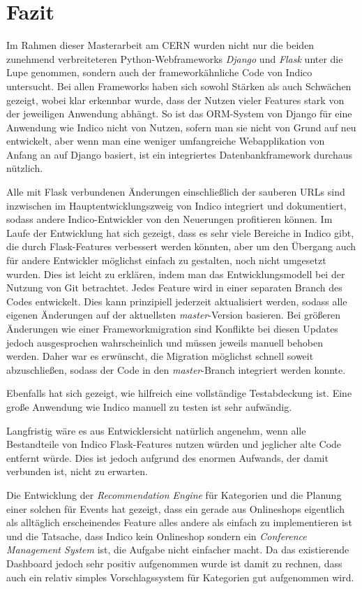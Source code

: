 \chapter{Fazit}

Im Rahmen dieser Masterarbeit am CERN wurden nicht nur die beiden zunehmend verbreiteteren
Python-Webframeworks \emph{Django} und \emph{Flask} unter die Lupe genommen, sondern auch der
frameworkähnliche Code von Indico untersucht. Bei allen Frameworks haben sich sowohl Stärken als
auch Schwächen gezeigt, wobei klar erkennbar wurde, dass der Nutzen vieler Features stark von der
jeweiligen Anwendung abhängt. So ist das ORM-System von Django für eine Anwendung
wie Indico nicht von Nutzen, sofern man sie nicht von Grund auf neu entwickelt, aber wenn man eine
weniger umfangreiche Webapplikation von Anfang an auf Django basiert, ist ein integriertes
Datenbankframework durchaus nützlich.

Alle mit Flask verbundenen Änderungen einschließlich der sauberen URLs sind inzwischen im
Hauptentwicklungszweig von Indico integriert und dokumentiert, sodass andere Indico-Entwickler von
den Neuerungen profitieren können. Im Laufe der Entwicklung hat sich gezeigt, dass es sehr viele
Bereiche in Indico gibt, die durch Flask-Features verbessert werden könnten, aber um den Übergang
auch für andere Entwickler möglichst einfach zu gestalten, noch nicht umgesetzt wurden. Dies ist
leicht zu erklären, indem man das Entwicklungsmodell bei der Nutzung von Git betrachtet. Jedes
Feature wird in einer separaten Branch des Codes entwickelt. Dies kann prinzipiell jederzeit
aktualisiert werden, sodass alle eigenen Änderungen auf der aktuellsten \emph{master}-Version
basieren. Bei größeren Änderungen wie einer Frameworkmigration sind Konflikte bei diesen Updates
jedoch ausgesprochen wahrscheinlich und müssen jeweils manuell behoben werden. Daher war es
erwünscht, die Migration möglichst schnell soweit abzuschließen, sodass der Code in den
\emph{master}-Branch integriert werden konnte.

Ebenfalls hat sich gezeigt, wie hilfreich eine vollständige Testabdeckung ist. Eine große Anwendung
wie Indico manuell zu testen ist sehr aufwändig.

Langfristig wäre es aus Entwicklersicht natürlich angenehm, wenn alle Bestandteile von Indico
Flask-Features nutzen würden und jeglicher alte Code entfernt würde. Dies ist jedoch aufgrund des
enormen Aufwands, der damit verbunden ist, nicht zu erwarten.

Die Entwicklung der \emph{Recommendation Engine} für Kategorien und die Planung einer solchen für
Events hat gezeigt, dass ein gerade aus Onlineshops eigentlich als alltäglich erscheinendes Feature
alles andere als einfach zu implementieren ist und die Tatsache, dass Indico kein Onlineshop sondern
ein \emph{Conference Management System} ist, die Aufgabe nicht einfacher macht. Da das existierende
Dashboard jedoch sehr positiv aufgenommen wurde ist damit zu rechnen, dass auch ein relativ simples
Vorschlagssystem für Kategorien gut aufgenommen wird.
